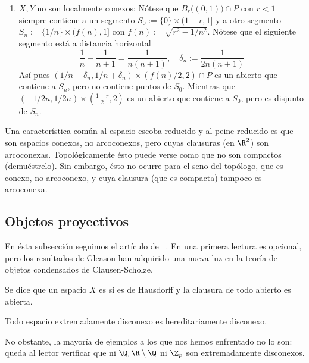 \documentclass[topologia-analisis.tex]{subfiles}
\begin{document}
\begin{ex}
\begin{enumerate}
		\item \underline{$X, Y$ no son localmente conexos:} 
			Nótese que $B_r\big( (0, 1) \big) \cap P$ con $r < 1$ siempre contiene a un segmento
			$ S_0 := \{0\} \times (1-r, 1]$ y a otro segmento $ S_n := \{1/n\} \times (f(n),1]$ con $f(n) := \sqrt{r^2 - 1/n^2}$.
			Nótese que el siguiente segmento está a distancia horizontal
			$$ \frac{1}{n} - \frac{1}{n+1} = \frac{1}{n(n+1)}, \quad \delta_n := \frac{1}{2n(n+1)} $$
			Así pues $( 1/n - \delta_n, 1/n + \delta_n ) \times (f(n)/2, 2) \cap P$ es un abierto que contiene a $S_n$, pero no contiene puntos de $S_0$.
			Mientras que $(-1/2n, 1/2n) \times ( \frac{1-r}{2}, 2 )$ es un abierto que contiene a $S_0$, pero es disjunto de $S_n$.
	\end{enumerate}
\end{ex}

Una característica común al espacio escoba reducido y al peine reducido es que son espacios conexos, no arcoconexos,
pero cuyas clausuras (en $\R^2$) son arcoconexas.
Topológicamente ésto puede verse como que no son compactos (demuéstrelo).
Sin embargo, ésto no ocurre para el seno del topólogo, que es conexo, no arcoconexo, y cuya clausura (que es compacta) tampoco es arcoconexa.

\subsection{Objetos proyectivos}
En ésta subsección seguimos el artículo de \citeauthor{gleason58projective}~\cite{gleason58projective}.
En una primera lectura es opcional, pero los resultados de Gleason han adquirido una nueva luz en la teoría de objetos condensados de Clausen-Scholze.

\begin{mydef}
	Se dice que un espacio $X$ es 
	si es de Hausdorff y la clausura de todo abierto es abierta.
\end{mydef}
\begin{thm}
	Todo espacio extremadamente disconexo es hereditariamente disconexo.
\end{thm}
No obstante, la mayoría de ejemplos a los que nos hemos enfrentado no lo son: queda al lector verificar que ni $\Q, \R \setminus \Q$
ni $\Z_p$ son extremadamente disconexos.
\end{document}
